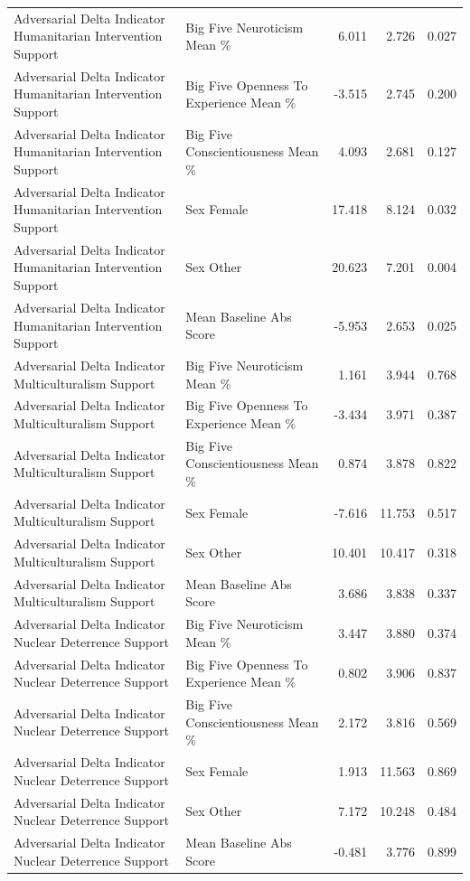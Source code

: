\begin{table}[htbp]
\begin{threeparttable}
\begin{tabular}{llrrr}
Adversarial Delta Indicator Humanitarian Intervention Support & Big Five Neuroticism Mean \% & 6.011 & 2.726 & 0.027 \\
Adversarial Delta Indicator Humanitarian Intervention Support & Big Five Openness To Experience Mean \% & -3.515 & 2.745 & 0.200 \\
Adversarial Delta Indicator Humanitarian Intervention Support & Big Five Conscientiousness Mean \% & 4.093 & 2.681 & 0.127 \\
Adversarial Delta Indicator Humanitarian Intervention Support & Sex Female & 17.418 & 8.124 & 0.032 \\
Adversarial Delta Indicator Humanitarian Intervention Support & Sex Other & 20.623 & 7.201 & 0.004 \\
Adversarial Delta Indicator Humanitarian Intervention Support & Mean Baseline Abs Score & -5.953 & 2.653 & 0.025 \\
Adversarial Delta Indicator Multiculturalism Support & Big Five Neuroticism Mean \% & 1.161 & 3.944 & 0.768 \\
Adversarial Delta Indicator Multiculturalism Support & Big Five Openness To Experience Mean \% & -3.434 & 3.971 & 0.387 \\
Adversarial Delta Indicator Multiculturalism Support & Big Five Conscientiousness Mean \% & 0.874 & 3.878 & 0.822 \\
Adversarial Delta Indicator Multiculturalism Support & Sex Female & -7.616 & 11.753 & 0.517 \\
Adversarial Delta Indicator Multiculturalism Support & Sex Other & 10.401 & 10.417 & 0.318 \\
Adversarial Delta Indicator Multiculturalism Support & Mean Baseline Abs Score & 3.686 & 3.838 & 0.337 \\
Adversarial Delta Indicator Nuclear Deterrence Support & Big Five Neuroticism Mean \% & 3.447 & 3.880 & 0.374 \\
Adversarial Delta Indicator Nuclear Deterrence Support & Big Five Openness To Experience Mean \% & 0.802 & 3.906 & 0.837 \\
Adversarial Delta Indicator Nuclear Deterrence Support & Big Five Conscientiousness Mean \% & 2.172 & 3.816 & 0.569 \\
Adversarial Delta Indicator Nuclear Deterrence Support & Sex Female & 1.913 & 11.563 & 0.869 \\
Adversarial Delta Indicator Nuclear Deterrence Support & Sex Other & 7.172 & 10.248 & 0.484 \\
Adversarial Delta Indicator Nuclear Deterrence Support & Mean Baseline Abs Score & -0.481 & 3.776 & 0.899 \\

\end{tabular}
\end{threeparttable}
\end{table}
